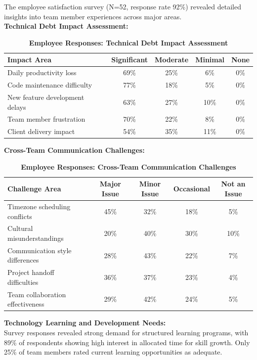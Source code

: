 \documentclass[12pt,a4paper,oneside]{book}
\begin{document}
The employee satisfaction survey (N=52, response rate 92\%) revealed detailed insights into team member experiences across major areas.\\

\textbf{Technical Debt Impact Assessment:}
\begin{table}[H]
\centering
\caption{\textbf{Employee Responses: Technical Debt Impact Assessment}}
\begin{tabular}{|l|c|c|c|c|}
\hline
Impact Area & Significant & Moderate & Minimal & None \\
\hline
Daily productivity loss & 69\% & 25\% & 6\% & 0\% \\
Code maintenance difficulty & 77\% & 18\% & 5\% & 0\% \\
New feature development delays & 63\% & 27\% & 10\% & 0\% \\
Team member frustration & 70\% & 22\% & 8\% & 0\% \\
Client delivery impact & 54\% & 35\% & 11\% & 0\% \\
\hline
\end{tabular}
\end{table}

\textbf{Cross-Team Communication Challenges:}
\begin{table}[H]
\centering
\caption{\textbf{Employee Responses: Cross-Team Communication Challenges}}
\begin{tabular}{|l|c|c|c|c|}
\hline
Challenge Area & Major Issue & Minor Issue & Occasional & Not an Issue \\
\hline
Timezone scheduling conflicts & 45\% & 32\% & 18\% & 5\% \\
Cultural misunderstandings & 20\% & 40\% & 30\% & 10\% \\
Communication style differences & 28\% & 43\% & 22\% & 7\% \\
Project handoff difficulties & 36\% & 37\% & 23\% & 4\% \\
Team collaboration effectiveness & 29\% & 42\% & 24\% & 5\% \\
\hline
\end{tabular}
\end{table}

\textbf{Technology Learning and Development Needs:}\\

Survey responses revealed strong demand for structured learning programs, with 89\% of respondents showing high interest in allocated time for skill growth. Only 25\% of team members rated current learning opportunities as adequate.\\
\end{document}
